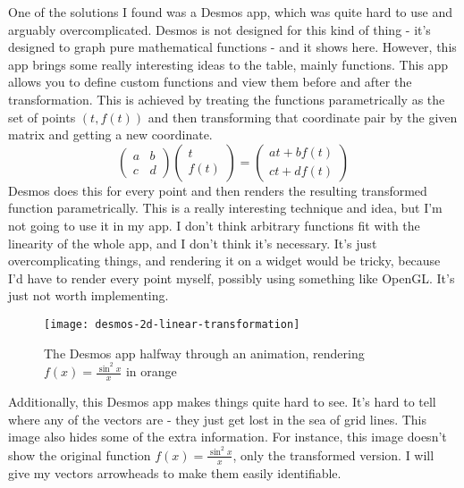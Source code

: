 \documentclass[../main.tex]{subfiles}
\begin{document}
One of the solutions I found was a Desmos app\cite{desmos-2d-linear-transformation}, which was quite hard to use and arguably overcomplicated. Desmos is not designed for this kind of thing - it's designed to graph pure mathematical functions - and it shows here. However, this app brings some really interesting ideas to the table, mainly functions. This app allows you to define custom functions and view them before and after the transformation. This is achieved by treating the functions parametrically as the set of points $(t, f(t))$ and then transforming that coordinate pair by the given matrix and getting a new coordinate.
\[\begin{pmatrix}
	a & b\\
	c & d
\end{pmatrix}
\begin{pmatrix}
	t\\
	f(t)
\end{pmatrix} = \begin{pmatrix}
	at + bf(t)\\
	ct + df(t)
\end{pmatrix}\]
Desmos does this for every point and then renders the resulting transformed function parametrically. This is a really interesting technique and idea, but I'm not going to use it in my app. I don't think arbitrary functions fit with the linearity of the whole app, and I don't think it's necessary. It's just overcomplicating things, and rendering it on a widget would be tricky, because I'd have to render every point myself, possibly using something like OpenGL. It's just not worth implementing.

\begin{figure}[h]
	\centering
	\texttt{[image: desmos-2d-linear-transformation]}
	\caption{The Desmos app halfway through an animation, rendering $f(x) = \frac{\sin^2 x}{x}$ in orange}
	\label{fig:desmos-2d-linear-transformation}
\end{figure}

Additionally, this Desmos app makes things quite hard to see. It's hard to tell where any of the vectors are - they just get lost in the sea of grid lines. This image also hides some of the extra information. For instance, this image doesn't show the original function $f(x) = \frac{\sin^2 x}{x}$, only the transformed version. I will give my vectors arrowheads to make them easily identifiable.
\end{document}
